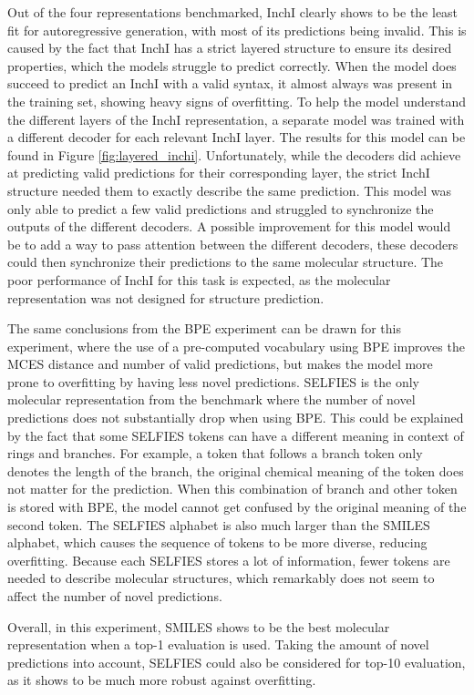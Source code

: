 Out of the four representations benchmarked, InchI clearly shows to be the least fit for autoregressive generation, with most of its predictions being invalid.
This is caused by the fact that InchI has a strict layered structure to ensure its desired properties, which the models struggle to predict correctly.
When the model does succeed to predict an InchI with a valid syntax, it almost always was present in the training set, showing heavy signs of overfitting.
To help the model understand the different layers of the InchI representation, a separate model was trained with a different decoder for each relevant InchI layer. 
The results for this model can be found in Figure \ref{fig:layered_inchi}.
Unfortunately, while the decoders did achieve at predicting valid predictions for their corresponding layer, the strict InchI structure needed them to exactly describe the same prediction.
This model was only able to predict a few valid predictions and struggled to synchronize the outputs of the different decoders.
A possible improvement for this model would be to add a way to pass attention between the different decoders, these decoders could then synchronize their predictions to the same molecular structure.
The poor performance of InchI for this task is expected, as the molecular representation was not designed for structure prediction.

The same conclusions from the \ac{BPE} experiment can be drawn for this experiment, where the use of a pre-computed vocabulary using \ac{BPE} improves the MCES distance and number of valid predictions, but makes the model more prone to overfitting by having less novel predictions.
SELFIES is the only molecular representation from the benchmark where the number of novel predictions does not substantially drop when using \ac{BPE}.
This could be explained by the fact that some SELFIES tokens can have a different meaning in context of rings and branches. 
For example, a token that follows a branch token only denotes the length of the branch, the original chemical meaning of the token does not matter for the prediction.
When this combination of branch and other token is stored with \ac{BPE}, the model cannot get confused by the original meaning of the second token.
The SELFIES alphabet is also much larger than the SMILES alphabet, which causes the sequence of tokens to be more diverse, reducing overfitting.
Because each SELFIES stores a lot of information, fewer tokens are needed to describe molecular structures, which remarkably does not seem to affect the number of novel predictions.

Overall, in this experiment, SMILES shows to be the best molecular representation when a top-1 evaluation is used.
Taking the amount of novel predictions into account, SELFIES could also be considered for top-10 evaluation, as it shows to be much more robust against overfitting.
